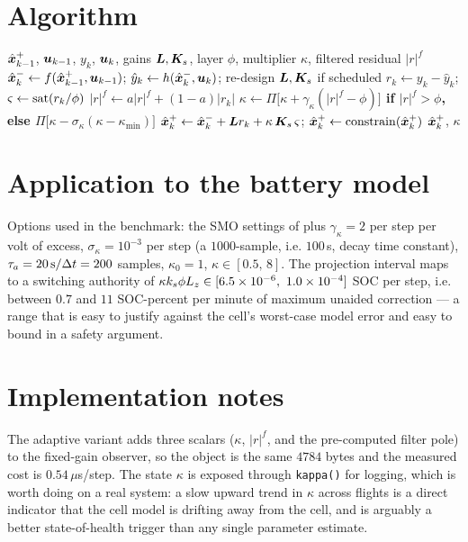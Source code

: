 \section{Algorithm}
\begin{algorithm}[H]
\caption{SMO-Adaptive --- one sampling period (differences from  in bold)}
\begin{algorithmic}[1]
\Require $\hat{\bm{x}}^{+}_{k-1}$, $\bm{u}_{k-1}$, $y_k$, $\bm{u}_k$, gains $\bm{L},\bm{K}_s$, layer $\phi$, multiplier $\kappa$, filtered residual $|r|^f$
\State $\hat{\bm{x}}^{-}_k \gets f(\hat{\bm{x}}^{+}_{k-1},\bm{u}_{k-1})$; \quad $\hat{y}_k \gets h(\hat{\bm{x}}^{-}_k,\bm{u}_k)$; \quad re-design $\bm{L},\bm{K}_s$ if scheduled
\State $r_k \gets y_k - \hat{y}_k$; \quad $\varsigma \gets \operatorname{sat}(r_k/\phi)$
\State \textbf{$|r|^f \gets a|r|^f + (1-a)|r_k|$}
\State \textbf{$\kappa \gets \Pi\big[\kappa + \gamma_\kappa(|r|^f-\phi)\big]$ if $|r|^f>\phi$, else $\Pi\big[\kappa - \sigma_\kappa(\kappa-\kappa_{\min})\big]$}
\State $\hat{\bm{x}}^{+}_k \gets \hat{\bm{x}}^{-}_k + \bm{L} r_k + \kappa\,\bm{K}_s\,\varsigma$; \quad $\hat{\bm{x}}^{+}_k \gets \operatorname{constrain}(\hat{\bm{x}}^{+}_k)$
\Ensure $\hat{\bm{x}}^{+}_k$, $\kappa$
\end{algorithmic}
\end{algorithm}

\section{Application to the battery model}
Options used in the benchmark: the SMO settings of  plus $\gamma_\kappa = 2$ per
step per volt of excess, $\sigma_\kappa = 10^{-3}$ per step (a $1000$-sample, i.e. $100$\,s,
decay time constant), $\tau_a = 20\,\mathrm{s}/\Delta t = 200$ samples,
$\kappa_0 = 1$, $\kappa\in[0.5,\,8]$.  The projection interval maps to a switching authority of
$\kappa k_s \phi L_{\soc} \in [6.5\times10^{-6},\ 1.0\times10^{-4}]$ SOC per step, i.e. between
$0.7$ and $11$ SOC-percent per minute of maximum unaided correction --- a range that is easy to
justify against the cell's worst-case model error and easy to bound in a safety argument.

\section{Implementation notes}
The adaptive variant adds three scalars ($\kappa$, $|r|^f$, and the pre-computed filter pole) to
the fixed-gain observer, so the object is the same $4784$ bytes and the measured cost is
$0.54\,\mu$s/step.  The state $\kappa$ is exposed through \texttt{kappa()} for logging, which is
worth doing on a real system: a slow upward trend in $\kappa$ across flights is a direct
indicator that the cell model is drifting away from the cell, and is arguably a better
state-of-health trigger than any single parameter estimate.

